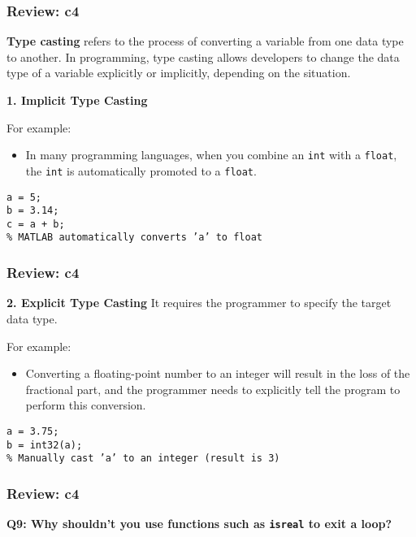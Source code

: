 \documentclass[
	11pt, %
]{beamer}
\begin{document}
\begin{frame}
	\frametitle{Review: c4}

\textbf{Type casting} refers to the process of converting a variable from one data type to another. In programming, type casting allows developers to change the data type of a variable explicitly or implicitly, depending on the situation.

\vspace{0.5cm
}
\textbf{1. Implicit Type Casting}

For example:
\begin{itemize}
    \item In many programming languages, when you combine an \texttt{int} with a \texttt{float}, the \texttt{int} is automatically promoted to a \texttt{float}.
\end{itemize}

\texttt{a = 5;} \\
\texttt{b = 3.14;} \\
\texttt{c = a + b;} \\
\texttt{\% MATLAB automatically converts 'a' to float}

\end{frame}


\begin{frame}
	\frametitle{Review: c4}


\textbf{2. Explicit Type Casting}
It requires the programmer to specify the target data type.

For example:
\begin{itemize}
    \item Converting a floating-point number to an integer will result in the loss of the fractional part, and the programmer needs to explicitly tell the program to perform this conversion.
\end{itemize}

\texttt{a = 3.75;} \\
\texttt{b = int32(a);} \\
\texttt{\% Manually cast 'a' to an integer (result is 3)}

\end{frame}



\begin{frame}
	\frametitle{Review: c4}

	\textbf{Q9: Why shouldn't you use functions such as \texttt{isreal} to exit a loop?}

\end{frame}
\end{document}

